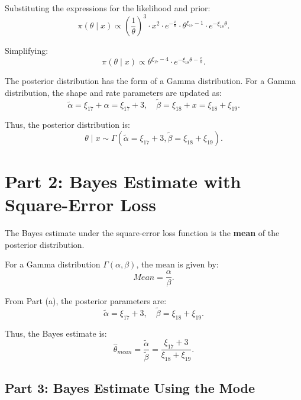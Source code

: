 Substituting the expressions for the likelihood and prior:
\begin{equation}
\pi(\theta \mid x) \propto \left(\frac{1}{\theta}\right)^3 \cdot x^2 \cdot e^{-\frac{x}{\theta}} \cdot \theta^{\xi_{17}-1} \cdot e^{-\xi_{18} \theta}.
\end{equation}

Simplifying:
\begin{equation}
\pi(\theta \mid x) \propto \theta^{\xi_{17} - 4} \cdot e^{-\xi_{18} \theta - \frac{x}{\theta}}.
\end{equation}

The posterior distribution has the form of a Gamma distribution. For a Gamma distribution, the shape and rate parameters are updated as:
\begin{equation}
\tilde{\alpha} = \xi_{17} + \alpha = \xi_{17} + 3, \quad
\tilde{\beta} = \xi_{18} + x = \xi_{18} + \xi_{19}.
\end{equation}

Thus, the posterior distribution is:
\begin{equation}
\theta \mid x \sim \Gamma(\tilde{\alpha} = \xi_{17} + 3, \tilde{\beta} = \xi_{18} + \xi_{19}).
\end{equation}

\section*{Part 2: Bayes Estimate with Square-Error Loss}

The Bayes estimate under the square-error loss function is the \textbf{mean} of the posterior distribution. 

For a Gamma distribution $ \Gamma(\alpha, \beta) $, the mean is given by:
\begin{equation}
Mean = \frac{\alpha}{\beta}.
\end{equation}

From Part (a), the posterior parameters are:
\begin{equation}
\tilde{\alpha} = \xi_{17} + 3, \quad \tilde{\beta} = \xi_{18} + \xi_{19}.
\end{equation}

Thus, the Bayes estimate is:
\begin{equation}
\hat{\theta}_{mean} = \frac{\tilde{\alpha}}{\tilde{\beta}} = \frac{\xi_{17} + 3}{\xi_{18} + \xi_{19}}.
\end{equation}

\subsection{Part 3: Bayes Estimate Using the Mode}

